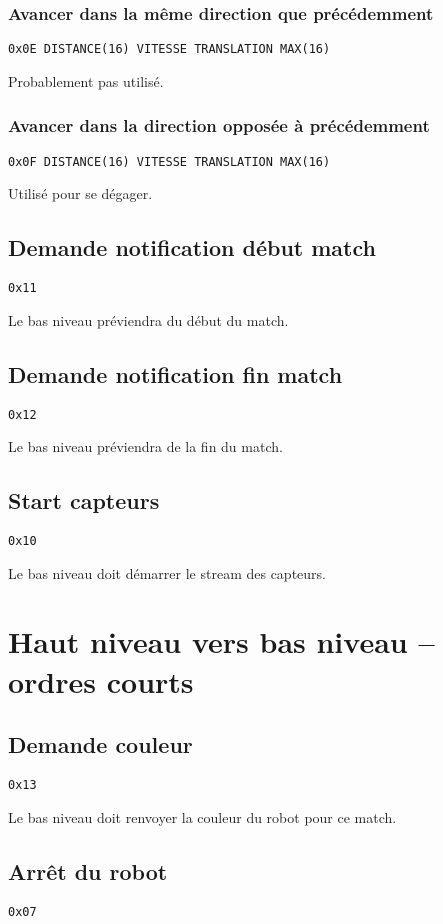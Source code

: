 \documentclass[a4paper, 12pt]{article}
\begin{document}
\subsubsection{Avancer dans la même direction que précédemment}

    \texttt{0x0E DISTANCE(16) VITESSE  TRANSLATION  MAX(16)}
    
Probablement pas utilisé.

\subsubsection{Avancer dans la direction opposée à précédemment}

    \texttt{0x0F DISTANCE(16) VITESSE  TRANSLATION  MAX(16)}

Utilisé pour se dégager.


\subsection{Demande notification début match}
    \texttt{0x11}

Le bas niveau préviendra du début du match.
   
   \subsection{Demande notification fin match}
       \texttt{0x12}
   
   Le bas niveau préviendra de la fin du match.
  
    
\subsection{Start capteurs}
\texttt{0x10}
    
Le bas niveau doit démarrer le stream des capteurs.
    
\section{Haut niveau vers bas niveau -- ordres courts}
    
\subsection{Demande couleur}
    \texttt{0x13}

Le bas niveau doit renvoyer la couleur du robot pour ce match.

    
\subsection{Arrêt du robot}
\texttt{0x07}
   
\end{document}
